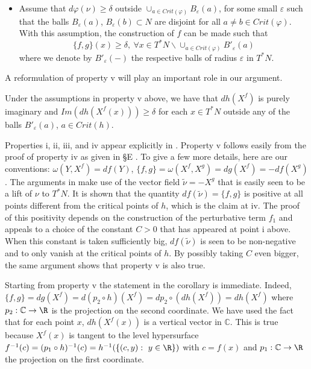 \begin{itemize}
\item[v.] Assume that $d\varphi (\nu)\geq \delta$ outside $\cup_{a\in Crit(\varphi)}B_{\varepsilon}(a)$, for some small $\varepsilon$ such that the balls $B_{\varepsilon}(a)$, $B_{\varepsilon}(b)\subset N$ are disjoint for all $a\not=b\in Crit(\varphi)$.  
With this assumption, the construction of $f$ can be made such that 
$$\{f,g\}(x)\geq \delta,  \ \forall x\in T^{\ast}N\backslash \cup_{a\in Crit(\varphi)} B'_{\varepsilon}(a)$$
where we denote by $B'_{\varepsilon}(-)$ the respective balls of radius $\varepsilon$ in $T^{\ast}N$.
\end{itemize}

A reformulation of property v will play an important role in our argument.

\begin{cor}\label{cor:size_proj}
Under the assumptions in property \textnormal{v} above, we have that $dh(X^{f})$ is purely imaginary and $Im(dh(X^{f}(x)))\geq \delta$ for each $x\in T^{\ast}N$ outside any of the balls $B'_{\varepsilon}(a)$, $a\in Crit(h)$.
\end{cor}

Properties i, ii, iii, and iv appear explicitly in \cite{Gir:Lef-cot}. Property 
v follows easily from the proof of property iv as given in \S E \cite{Gir:Lef-cot}. To give a few more details, here are our conventions: $\omega (Y,X^{f})=df(Y)$, $\{f,g\}=\omega (X^{f},X^{g})=dg(X^{f})=-df(X^{g})$. The arguments in \cite{Gir:Lef-cot} make use of the vector field $\tilde{\nu}= -X^{g}$ that is easily seen to be a lift of $\nu$ to $T^{\ast}N$. 
It is shown that the quantity $df(\tilde{\nu})=\{f,g\}$ is positive at all points different from the critical points of $h$, which is the claim at  iv. The proof of this positivity depends on the construction of the perturbative term $f_{1}$ and appeals to a choice of the constant $C>0$ that has appeared at point i above. When this constant is taken sufficiently big, $df(\tilde{\nu})$ is  seen to be non-negative and to only vanish at the critical points of $h$. By possibly taking $C$ even bigger,  the same argument shows that property v is also true. 

Starting from property v the statement in the corollary is immediate. Indeed,
$\{f,g\}=dg (X^{f})= d(p_{2}\circ h)(X^{f})=
dp_{2}\circ (dh (X^{f}))=dh( X^{f})$ where $p_{2}:\mathbb{C}\to \R$
is the projection on the second coordinate. We have used the fact that for each
point $x$, $dh( X^{f}(x))$ is a vertical vector in $\mathbb{C}$. This is 
true because $X^{f}(x)$ is tangent to the level hypersurface  $f^{-1}(c)=(p_{1}\circ h)^{-1}(c) =h^{-1} (\{(c,y) : \ y\in \R\})$ with $c=f(x)$ and $p_{1}:\mathbb{C}\to \R$ the projection on the first coordinate. 

